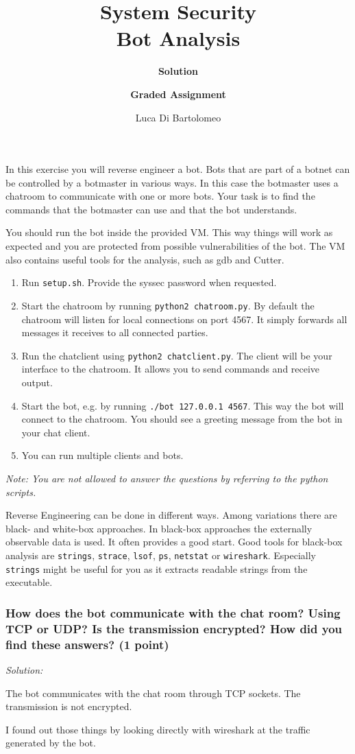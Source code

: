 \documentclass[a4paper,11pt]{article}
\title{System Security\\
Bot Analysis}
\author{\bf Solution}
\author{\bf Graded Assignment}
\author{Luca Di Bartolomeo}
\newenvironment{solution}%
{\par{\noindent\small\textit{Solution:}}\vspace{-12pt}\begin{framed}}%
{\end{framed}\par}
\begin{document}
\maketitle

In this exercise you will reverse engineer a bot. Bots that are part of a botnet
can be controlled by a botmaster in various ways. In this case the botmaster
uses a chatroom to communicate with one or more bots. Your task is to find the
commands that the botmaster can use and that the bot understands. 

You should run the bot inside the provided VM. This way things will
work as expected and you are protected from possible vulnerabilities of the bot. The VM also contains useful tools for the analysis, such as gdb and Cutter.

\begin{enumerate}
\item Run \texttt{setup.sh}. Provide the syssec password when requested.
\item Start the chatroom by running \verb|python2 chatroom.py|. By
default the chatroom will listen for local connections on port 4567. It simply
forwards all messages it receives to all connected parties.
\item Run the chatclient using \verb|python2 chatclient.py|. The client will
be your interface to the chatroom. It allows you to send commands and receive
output.
\item Start the bot, e.g. by running \verb|./bot 127.0.0.1 4567|. This way the
bot will connect to the chatroom. You should see a greeting message from the bot
in your chat client.
\item You can run multiple clients and bots.
\end{enumerate}

\noindent\emph{Note: You are not allowed to answer the questions by referring to the python scripts.}

Reverse Engineering can be done in different ways. Among variations there are
black- and white-box approaches. In black-box approaches the externally
observable data is used. It often provides a good start. Good tools for
black-box analysis are \texttt{strings}, \texttt{strace}, \texttt{lsof},
\texttt{ps}, \texttt{netstat} or \texttt{wireshark}. Especially \texttt{strings}
might be useful for you as it extracts readable strings from the executable.

\subsubsection*{How does the bot communicate with the chat room? Using TCP or
UDP? Is the transmission encrypted? How did you find these answers?
\ifsolution (1 point) \fi}
\ifsolution
\begin{solution}
	The bot communicates with the chat room through TCP sockets. The transmission is not encrypted. 
	
	I found out those things by looking directly with wireshark at the traffic generated by the bot.
\end{solution}\fi
\end{document}
